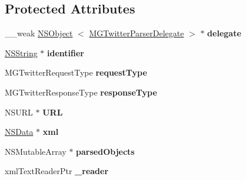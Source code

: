 \subsection*{\-Protected \-Attributes}
\begin{DoxyCompactItemize}
\item 
\hypertarget{interface_m_g_twitter_lib_x_m_l_parser_a184db7a7f7a5668c65327da312f70d9b}{
\-\_\-\-\_\-weak \hyperlink{class_n_s_object}{\-N\-S\-Object}\*
$<$ \hyperlink{protocol_m_g_twitter_parser_delegate-p}{\-M\-G\-Twitter\-Parser\-Delegate} $>$ $\ast$ {\bfseries delegate}}
\label{interface_m_g_twitter_lib_x_m_l_parser_a184db7a7f7a5668c65327da312f70d9b}

\item 
\hypertarget{interface_m_g_twitter_lib_x_m_l_parser_a6bf33b36636888a1b1e97d0d4dd58230}{
\hyperlink{class_n_s_string}{\-N\-S\-String} $\ast$ {\bfseries identifier}}
\label{interface_m_g_twitter_lib_x_m_l_parser_a6bf33b36636888a1b1e97d0d4dd58230}

\item 
\hypertarget{interface_m_g_twitter_lib_x_m_l_parser_a150ab71fc3611c97a9b587967c56ff72}{
\-M\-G\-Twitter\-Request\-Type {\bfseries request\-Type}}
\label{interface_m_g_twitter_lib_x_m_l_parser_a150ab71fc3611c97a9b587967c56ff72}

\item 
\hypertarget{interface_m_g_twitter_lib_x_m_l_parser_a0e99d022367059e3bb1b163e0c2a91ae}{
\-M\-G\-Twitter\-Response\-Type {\bfseries response\-Type}}
\label{interface_m_g_twitter_lib_x_m_l_parser_a0e99d022367059e3bb1b163e0c2a91ae}

\item 
\hypertarget{interface_m_g_twitter_lib_x_m_l_parser_ac1d54db820becf2863f3a0b4ee2eea79}{
\-N\-S\-U\-R\-L $\ast$ {\bfseries \-U\-R\-L}}
\label{interface_m_g_twitter_lib_x_m_l_parser_ac1d54db820becf2863f3a0b4ee2eea79}

\item 
\hypertarget{interface_m_g_twitter_lib_x_m_l_parser_a75cce5f93b5e9a5626ac154ddf46c256}{
\hyperlink{class_n_s_data}{\-N\-S\-Data} $\ast$ {\bfseries xml}}
\label{interface_m_g_twitter_lib_x_m_l_parser_a75cce5f93b5e9a5626ac154ddf46c256}

\item 
\hypertarget{interface_m_g_twitter_lib_x_m_l_parser_ad2cb28f3261a932a357d27e45b9b7c29}{
\-N\-S\-Mutable\-Array $\ast$ {\bfseries parsed\-Objects}}
\label{interface_m_g_twitter_lib_x_m_l_parser_ad2cb28f3261a932a357d27e45b9b7c29}

\item 
\hypertarget{interface_m_g_twitter_lib_x_m_l_parser_a9d0f2cf9f7f4acc0be606a31228171e7}{
xml\-Text\-Reader\-Ptr {\bfseries \-\_\-reader}}
\label{interface_m_g_twitter_lib_x_m_l_parser_a9d0f2cf9f7f4acc0be606a31228171e7}

\end{DoxyCompactItemize}


